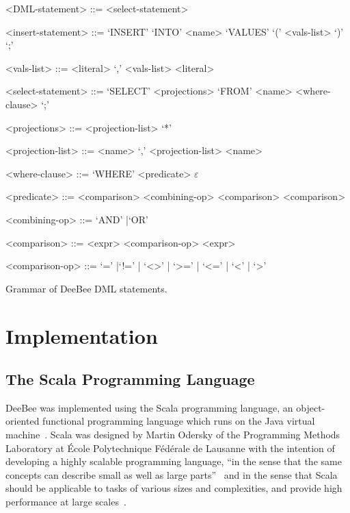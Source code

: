 \begin{listing}[h!]
\begin{grammar}
<DML-statement> ::= <select-statement>  

<insert-statement> ::= `INSERT' `INTO' <name> `VALUES' `(' <vals-list> `)' `;'

<vals-list> ::= <literal> `,' <vals-list> \alt <literal>

<select-statement> ::= `SELECT' <projections> `FROM' <name> <where-clause> `;'

<projections> ::= <projection-list> \alt `*'

<projection-list> ::= <name> `,' <projection-list> \alt <name>

<where-clause> ::= `WHERE' <predicate> \alt $\varepsilon$

<predicate> ::= <comparison> <combining-op> <comparison> \alt <comparison>

<combining-op> ::= `AND'  |`OR'

<comparison> ::= <expr> <comparison-op> <expr>

<comparison-op> ::= `=' |`!=' | `<>' | `>=' | `<='  | `<' | `>'
\end{grammar}
\caption{Grammar of DeeBee DML statements.}
\label{lst:dml-grammar}
\end{listing}

\section{Implementation}

\subsection{The Scala Programming Language}

DeeBee was implemented using the Scala programming language, an object-oriented functional programming language which runs on the Java virtual machine~\cite{odersky2004scala,odersky2004overview,odersky2008programming}. Scala was designed by Martin Odersky of the Programming Methods Laboratory at \'Ecole Polytechnique F\'ed\'erale de Lausanne with the intention of developing a highly scalable programming language, ``in the sense that the same concepts can describe small as well as large parts''~\cite{odersky2004scala} and in the sense that Scala should be applicable to tasks of various sizes and complexities, and provide high performance at large scales~\cite{odersky2008programming}. 

